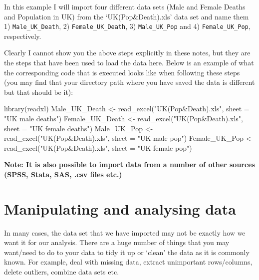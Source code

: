 \documentclass[
]{book}
\newenvironment{Shaded}{\begin{snugshade}}{\end{snugshade}}
\newcommand{\AttributeTok}[1]{\textcolor[rgb]{0.77,0.63,0.00}{#1}}
\newcommand{\FunctionTok}[1]{\textcolor[rgb]{0.00,0.00,0.00}{#1}}
\newcommand{\NormalTok}[1]{#1}
\newcommand{\OtherTok}[1]{\textcolor[rgb]{0.56,0.35,0.01}{#1}}
\newcommand{\StringTok}[1]{\textcolor[rgb]{0.31,0.60,0.02}{#1}}
\theoremstyle{definition}
\theoremstyle{definition}
\theoremstyle{definition}
\theoremstyle{definition}
\theoremstyle{remark}
\begin{document}
In this example I will import four different data sets (Male and Female Deaths and Population in UK) from the `UK(Pop\&Death).xls' data set and name them 1) \texttt{Male\_UK\_Death}, 2) \texttt{Female\_UK\_Death}, 3) \texttt{Male\_UK\_Pop} and 4) \texttt{Female\_UK\_Pop}, respectively.

Clearly I cannot show you the above steps explicitly in these notes, but they are the steps that have been used to load the data here. Below is an example of what the corresponding code that is executed looks like when following these steps (you may find that your directory path where you have saved the data is different but that should be it):

\begin{Shaded}
\begin{Highlighting}[]
\FunctionTok{library}\NormalTok{(readxl)}
\NormalTok{Male\_UK\_Death }\OtherTok{\textless{}{-}} \FunctionTok{read\_excel}\NormalTok{(}\StringTok{"UK(Pop\&Death).xls"}\NormalTok{, }\AttributeTok{sheet =} \StringTok{"UK male deaths"}\NormalTok{)}
\NormalTok{Female\_UK\_Death }\OtherTok{\textless{}{-}} \FunctionTok{read\_excel}\NormalTok{(}\StringTok{"UK(Pop\&Death).xls"}\NormalTok{, }\AttributeTok{sheet =} \StringTok{"UK female deaths"}\NormalTok{)}
\NormalTok{Male\_UK\_Pop }\OtherTok{\textless{}{-}} \FunctionTok{read\_excel}\NormalTok{(}\StringTok{"UK(Pop\&Death).xls"}\NormalTok{, }\AttributeTok{sheet =} \StringTok{"UK male pop"}\NormalTok{)}
\NormalTok{Female\_UK\_Pop }\OtherTok{\textless{}{-}} \FunctionTok{read\_excel}\NormalTok{(}\StringTok{"UK(Pop\&Death).xls"}\NormalTok{, }\AttributeTok{sheet =} \StringTok{"UK female pop"}\NormalTok{)}
\end{Highlighting}
\end{Shaded}

\textbf{Note: It is also possible to import data from a number of other sources (SPSS, Stata, SAS, .csv files etc.)}

\hypertarget{manipulating-and-analysing-data}{%
\section{Manipulating and analysing data}\label{manipulating-and-analysing-data}}

In many cases, the data set that we have imported may not be exactly how we want it for our analysis. There are a huge number of things that you may want/need to do to your data to tidy it up or `clean' the data as it is commonly known. For example, deal with missing data, extract unimportant rows/columns, delete outliers, combine data sets etc.
\end{document}
